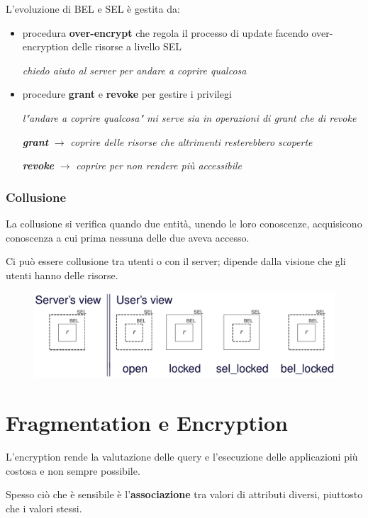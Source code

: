 \documentclass{report}
\begin{document}
\newpage
L'evoluzione di BEL e SEL è gestita da:
\begin{itemize}
    \item procedura \textbf{over-encrypt} che regola il processo di update facendo over-encryption delle risorse a livello SEL
    
    \textit{chiedo aiuto al server per andare a coprire qualcosa}
    \item procedure \textbf{grant} e \textbf{revoke} per gestire i privilegi
    
    \textit{l"andare a coprire qualcosa" mi serve sia in operazioni di grant che di revoke}

    \textit{\textbf{grant}} $\rightarrow$ \textit{coprire delle risorse che altrimenti resterebbero scoperte}
    
    \textbf{\textit{revoke}} $\rightarrow$ \textit{coprire per non rendere più accessibile}
\end{itemize}

\subsection{Collusione}
La collusione si verifica quando due entità, unendo le loro conoscenze, acquisicono conoscenza a cui 
prima nessuna delle due aveva accesso.

\noindent Ci può essere collusione tra utenti o con il server; dipende dalla visione che gli utenti hanno delle risorse.

\begin{figure}[ht]
    \centering
    \includegraphics[width=0.7\linewidth]{images/encryption/views.png}
\end{figure}

\chapter{Fragmentation e Encryption}
L'encryption rende la valutazione delle query e l'esecuzione delle applicazioni 
più costosa e non sempre possibile.

Spesso ciò che è sensibile è l'\textbf{associazione} tra valori di attributi diversi, 
piuttosto che i valori stessi.
\end{document}
